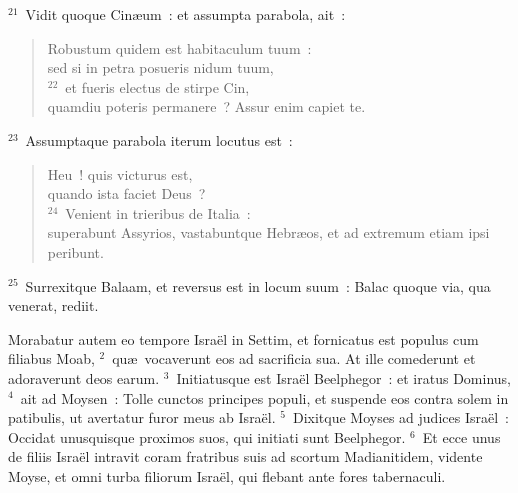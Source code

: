 ${}^{21}$~Vidit quoque Cin\ae um~: et assumpta parabola, ait~: \begin{flushleft}\begin{verse}Robustum quidem est habitaculum tuum~:\\ sed si in petra posueris nidum tuum,\\
${}^{22}$~et fueris electus de stirpe Cin,\\ quamdiu poteris permanere~? Assur enim capiet te.\end{verse}\end{flushleft}


${}^{23}$~Assumptaque parabola iterum locutus est~: \begin{flushleft}\begin{verse}Heu~! quis victurus est,\\ quando ista faciet Deus~?\\
${}^{24}$~Venient in trieribus de Italia~:\\ superabunt Assyrios, vastabuntque Hebr\ae os, et ad extremum etiam ipsi peribunt.\end{verse}\end{flushleft}


${}^{25}$~Surrexitque Balaam, et reversus est in locum suum~: Balac quoque via, qua venerat, rediit.

\lettrine[lines=3,image=true,loversize=0.05,lraise=-0.03]{M}{}orabatur autem eo tempore Isra\"el in Settim, et fornicatus est populus cum filiabus Moab,
${}^{2}$~qu\ae\ vocaverunt eos ad sacrificia sua. At ille comederunt et adoraverunt deos earum.
${}^{3}$~Initiatusque est Isra\"el Beelphegor~: et iratus Dominus,
${}^{4}$~ait ad Moysen~: Tolle cunctos principes populi, et suspende eos contra solem in patibulis, ut avertatur furor meus ab Isra\"el.
${}^{5}$~Dixitque Moyses ad judices Isra\"el~: Occidat unusquisque proximos suos, qui initiati sunt Beelphegor.
${}^{6}$~Et ecce unus de filiis Isra\"el intravit coram fratribus suis ad scortum Madianitidem, vidente Moyse, et omni turba filiorum Isra\"el, qui flebant ante fores tabernaculi.


